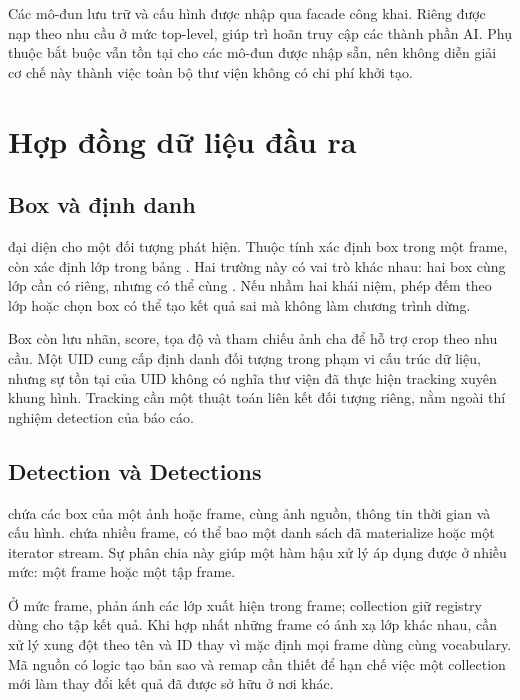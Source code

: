 Các mô-đun lưu trữ và cấu hình được nhập qua facade công khai. Riêng  được nạp theo nhu cầu ở mức top-level, giúp trì hoãn truy cập các thành phần AI. Phụ thuộc bắt buộc vẫn tồn tại cho các mô-đun được nhập sẵn, nên không diễn giải cơ chế này thành việc toàn bộ thư viện không có chi phí khởi tạo.

\section{Hợp đồng dữ liệu đầu ra}
\subsection{Box và định danh}
 đại diện cho một đối tượng phát hiện. Thuộc tính  xác định box trong một frame, còn  xác định lớp trong bảng . Hai trường này có vai trò khác nhau: hai box cùng lớp cần có  riêng, nhưng có thể cùng . Nếu nhầm hai khái niệm, phép đếm theo lớp hoặc chọn box có thể tạo kết quả sai mà không làm chương trình dừng.

Box còn lưu nhãn, score, tọa độ và tham chiếu ảnh cha để hỗ trợ crop theo nhu cầu. Một UID cung cấp định danh đối tượng trong phạm vi cấu trúc dữ liệu, nhưng sự tồn tại của UID không có nghĩa thư viện đã thực hiện tracking xuyên khung hình. Tracking cần một thuật toán liên kết đối tượng riêng, nằm ngoài thí nghiệm detection của báo cáo.

\subsection{Detection và Detections}
 chứa các box của một ảnh hoặc frame, cùng ảnh nguồn, thông tin thời gian và cấu hình.  chứa nhiều frame, có thể bao một danh sách đã materialize hoặc một iterator stream. Sự phân chia này giúp một hàm hậu xử lý áp dụng được ở nhiều mức: một frame hoặc một tập frame.

Ở mức frame,  phản ánh các lớp xuất hiện trong frame; collection giữ registry dùng cho tập kết quả. Khi hợp nhất những frame có ánh xạ lớp khác nhau, cần xử lý xung đột theo tên và ID thay vì mặc định mọi frame dùng cùng vocabulary. Mã nguồn có logic tạo bản sao và remap cần thiết để hạn chế việc một collection mới làm thay đổi kết quả đã được sở hữu ở nơi khác.

